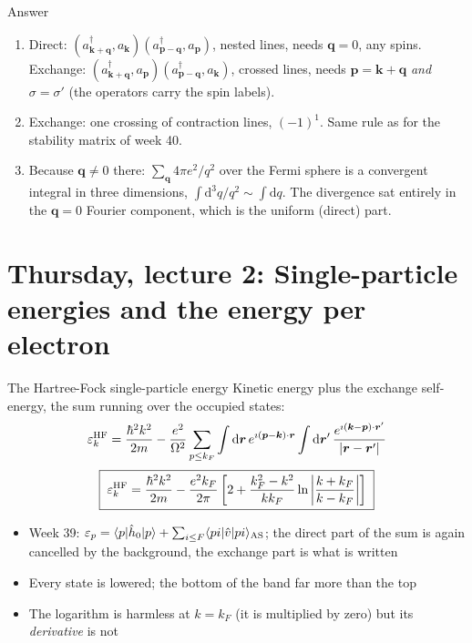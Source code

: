 \documentclass[aspectratio=169,10pt]{beamer}
\newcounter{thinkctr}
\newcommand{\thinka}[1]{%
  \vfill
  \begin{tcolorbox}[enhanced,colback=paleteal,colframe=teal,boxrule=1.2pt,arc=4pt,
    grow to left by=6mm,grow to right by=6mm,
    left=16pt,right=16pt,top=16pt,bottom=18pt,
    fonttitle=\bfseries\Large,fontupper=\large,
    title={Answer to pause \#\thethinkctr}]
  #1
  \end{tcolorbox}
  \vfill}
\newcommand{\element}[3]{\langle #1\vert #2\vert #3\rangle}
\newcommand{\ad}[1]{a_{#1}^{\dagger}}
\newcommand{\dd}{\mathrm{d}}
\begin{document}
\begin{frame}{Answer}
  \thinka{
  \begin{enumerate}
    \item Direct: $(\ad{\bm k+\bm q},a_{\bm k})(\ad{\bm p-\bm q},a_{\bm p})$, nested lines, needs $\bm q=0$, any spins. Exchange: $(\ad{\bm k+\bm q},a_{\bm p})(\ad{\bm p-\bm q},a_{\bm k})$, crossed lines, needs $\bm p=\bm k+\bm q$ \emph{and} $\sigma=\sigma'$ (the operators carry the spin labels).
    \item Exchange: one crossing of contraction lines, $(-1)^1$. Same rule as for the stability matrix of week 40.
    \item Because $\bm q\ne0$ there: $\sum_{\bm q}4\pi e^2/q^2$ over the Fermi sphere is a convergent integral in three dimensions, $\int\dd^3q/q^2\sim\int\dd q$. The divergence sat entirely in the $\bm q=0$ Fourier component, which is the uniform (direct) part.
  \end{enumerate}}
\end{frame}

\section{Thursday, lecture 2: Single-particle energies and the energy per electron}

\begin{frame}{The Hartree-Fock single-particle energy}
  Kinetic energy plus the exchange self-energy, the sum running over the occupied states:
  \[
    \varepsilon_k^{\rm HF}=\frac{\hbar^2k^2}{2m}-\frac{e^2}{\Omega^2}\sum_{p\le k_F}\int\dd\bm r\,e^{\imath(\bm p-\bm k)\cdot\bm r}\int\dd\bm r'\,\frac{e^{\imath(\bm k-\bm p)\cdot\bm r'}}{|\bm r-\bm r'|}
  \]
  \[
    \boxed{\;\varepsilon_k^{\rm HF}=\frac{\hbar^2k^2}{2m}-\frac{e^2k_F}{2\pi}\left[2+\frac{k_F^2-k^2}{kk_F}\ln\left|\frac{k+k_F}{k-k_F}\right|\right]\;}
  \]
  \begin{itemize}
    \item Week 39: $\varepsilon_p=\element{p}{\hat h_0}{p}+\sum_{i\le F}\element{pi}{\hat v}{pi}_{\rm AS}$; the direct part of the sum is again cancelled by the background, the exchange part is what is written
    \item Every state is lowered; the bottom of the band far more than the top
    \item The logarithm is harmless at $k=k_F$ (it is multiplied by zero) but its \emph{derivative} is not
  \end{itemize}
\end{frame}
\end{document}
